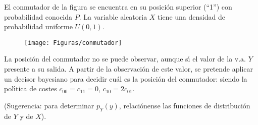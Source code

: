 \ifspanish

\question El conmutador de la figura se encuentra en su posici\'{o}n superior (``1'') con probabilidad conocida $P$. La variable aleatoria $X$ tiene una densidad de probabilidad uniforme $U(0,1)$. 
\begin{figure}[h]
\begin{center}
\texttt{[image: Figuras/conmutador]}
\end{center}
\end{figure}

\vspace{-0.2cm} La posici\'{o}n del conmutador no se puede observar, aunque s\'{\i} el valor de la v.a. $Y$ presente a su salida. A partir de la observaci\'{o}n de este valor, se pretende aplicar un decisor bayesiano
para decidir cu\'{a}l es la posici\'{o}n del conmutador: siendo la pol\'{\i}tica de costes $c_{00}=c_{11}=0$,
$c_{10}=2c_{01}$.
 
(Sugerencia: para determinar $p_Y(y)$, relaci\'{o}nense las funciones de distribuci\'{o}n de $Y$ y de $X$).

